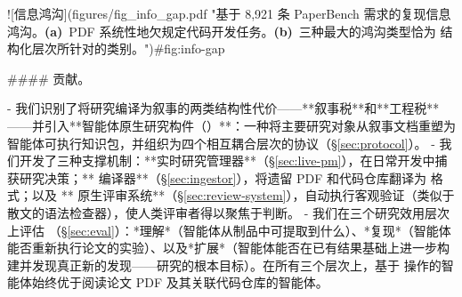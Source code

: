 \begin{markdown}
![信息鸿沟](figures/fig_info_gap.pdf "基于 8,921 条 PaperBench 需求的复现信息鸿沟。\textbf{(a)}~PDF 系统性地欠规定代码开发任务。\textbf{(b)}~三种最大的鸿沟类型恰为 \ara{} 结构化层次所针对的类别。"){#fig:info-gap}

#### 贡献。

- 我们识别了将研究编译为叙事的两类结构性代价——**叙事税**和**工程税**——并引入**智能体原生研究构件（\ara{}）**：一种将主要研究对象从叙事文档重塑为智能体可执行知识包，并组织为四个相互耦合层次的协议（\S\ref{sec:protocol}）。
- 我们开发了三种支撑机制：**实时研究管理器**（\S\ref{sec:live-pm}），在日常开发中捕获研究决策；**\ara{} 编译器**（\S\ref{sec:ingestor}），将遗留 PDF 和代码仓库翻译为 \ara{} 格式；以及 **\ara{} 原生评审系统**（\S\ref{sec:review-system}），自动执行客观验证（类似于散文的语法检查器），使人类评审者得以聚焦于判断。
- 我们在三个研究效用层次上评估 \ara{}（\S\ref{sec:eval}）：*理解*（智能体从制品中可提取到什么）、*复现*（智能体能否重新执行论文的实验）、以及*扩展*（智能体能否在已有结果基础上进一步构建并发现真正新的发现——研究的根本目标）。在所有三个层次上，基于 \ara{} 操作的智能体始终优于阅读论文 PDF 及其关联代码仓库的智能体。
\end{markdown}
